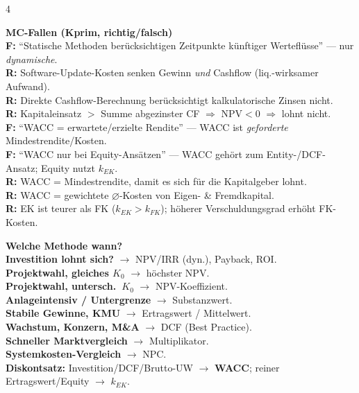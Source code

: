 \documentclass[8pt,a4paper,landscape]{extarticle}
\newcommand{\K}[1]{\textbf{\color{cB}#1}}
\newcommand{\R}[1]{\textbf{\color{red!72!black}#1}}
\begin{document}
\begin{multicols}{4}
\begin{tcolorbox}[colback=cWarn,colframe=red!55!black,boxrule=0.35pt,left=2.5pt,right=2.5pt,top=2pt,bottom=2pt,arc=1pt]
\textbf{MC-Fallen (Kprim, richtig/falsch)}\\
\R{F:} ``Statische Methoden berücksichtigen Zeitpunkte künftiger Werteflüsse'' — nur \emph{dynamische}.\\
\R{R:} Software-Update-Kosten senken Gewinn \emph{und} Cashflow (liq.-wirksamer Aufwand).\\
\R{R:} Direkte Cashflow-Berechnung berücksichtigt kalkulatorische Zinsen nicht.\\
\R{R:} Kapitaleinsatz $>$ Summe abgezinster CF
$\Rightarrow$ NPV$<$0
$\Rightarrow$ lohnt nicht.\\
\R{F:} ``WACC = erwartete/erzielte Rendite'' — WACC ist \emph{geforderte} Mindestrendite/Kosten.\\
\R{F:} ``WACC nur bei Equity-Ansätzen'' — WACC gehört zum Entity-/DCF-Ansatz;
Equity nutzt $k_{EK}$.\\
\R{R:} WACC = Mindestrendite, damit es sich für die Kapitalgeber lohnt.\\
\R{R:} WACC = gewichtete $\varnothing$-Kosten von Eigen- \& Fremdkapital.\\
\R{R:} EK ist teurer als FK ($k_{EK}>k_{FK}$);
höherer Verschuldungsgrad erhöht FK-Kosten.\\[3pt]
\end{tcolorbox}

\begin{tcolorbox}[colback=cEx,colframe=cB!70!black,boxrule=0.35pt,left=2.5pt,right=2.5pt,top=2pt,bottom=2pt,arc=1pt]
\textbf{Welche Methode wann?}\\
\R{Investition lohnt sich?}
$\to$ NPV/IRR (dyn.), Payback, ROI.\\
\R{Projektwahl, gleiches $K_0$}
$\to$ höchster NPV.\\
\R{Projektwahl, untersch.\ $K_0$}
$\to$ NPV-Koeffizient.\\
\R{Anlageintensiv / Untergrenze}
$\to$ Substanzwert.\\
\R{Stabile Gewinne, KMU}
$\to$ Ertragswert / Mittelwert.\\
\R{Wachstum, Konzern, M\&A}
$\to$ DCF (Best Practice).\\
\R{Schneller Marktvergleich}
$\to$ Multiplikator.\\
\R{Systemkosten-Vergleich}
$\to$ NPC.\\[3pt]
\textbf{Diskontsatz:} Investition/DCF/Brutto-UW
$\to$ \K{WACC};
reiner Ertragswert/Equity
$\to$ \K{$k_{EK}$}.
\end{tcolorbox}


\end{multicols}
\end{document}
